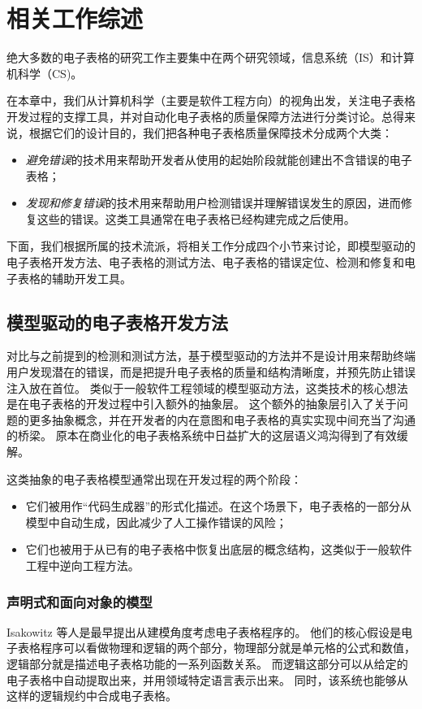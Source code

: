 \chapter{相关工作综述}

绝大多数的电子表格的研究工作主要集中在两个研究领域，信息系统（IS）和计算机科学（CS)。

在本章中，我们从计算机科学（主要是软件工程方向）的视角出发，关注电子表格开发过程的支撑工具，并对自动化电子表格的质量保障方法进行分类讨论。总得来说，根据它们的设计目的，我们把各种电子表格质量保障技术分成两个大类：

\begin{itemize}
    \item \textit{避免错误}的技术用来帮助开发者从使用的起始阶段就能创建出不含错误的电子表格；
    \item \textit{发现和修复错误}的技术用来帮助用户检测错误并理解错误发生的原因，进而修复这些的错误。这类工具通常在电子表格已经构建完成之后使用。
\end{itemize}

下面，我们根据所属的技术流派，将相关工作分成四个小节来讨论，即模型驱动的电子表格开发方法、电子表格的测试方法、电子表格的错误定位、检测和修复和电子表格的辅助开发工具。

\section{模型驱动的电子表格开发方法}

对比与之前提到的检测和测试方法，基于模型驱动的方法并不是设计用来帮助终端用户发现潜在的错误，而是把提升电子表格的质量和结构清晰度，并预先防止错误注入放在首位。
类似于一般软件工程领域的模型驱动方法，这类技术的核心想法是在电子表格的开发过程中引入额外的抽象层。
这个额外的抽象层引入了关于问题的更多抽象概念，并在开发者的内在意图和电子表格的真实实现中间充当了沟通的桥梁。
原本在商业化的电子表格系统中日益扩大的这层语义鸿沟\cite{luckey2012systematic}得到了有效缓解。

这类抽象的电子表格模型通常出现在开发过程的两个阶段：
\begin{itemize}
    \item 它们被用作“代码生成器”的形式化描述。在这个场景下，电子表格的一部分从模型中自动生成，因此减少了人工操作错误的风险；
    \item 它们也被用于从已有的电子表格中恢复出底层的概念结构，这类似于一般软件工程中逆向工程方法。
\end{itemize}

\subsection{声明式和面向对象的模型}
Isakowitz 等人\cite{isakowitz1995toward}是最早提出从建模角度考虑电子表格程序的。
他们的核心假设是电子表格程序可以看做物理和逻辑的两个部分，物理部分就是单元格的公式和数值，逻辑部分就是描述电子表格功能的一系列函数关系。
而逻辑这部分可以从给定的电子表格中自动提取出来，并用领域特定语言表示出来。
同时，该系统也能够从这样的逻辑规约中合成电子表格。

